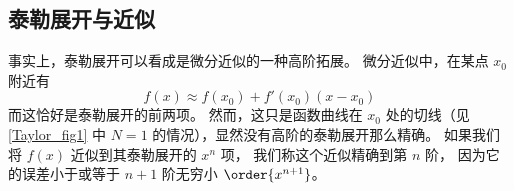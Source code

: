 \subsection{泰勒展开与近似}
事实上，泰勒展开可以看成是微分近似的一种高阶拓展。 微分近似中，在某点 $x_0$ 附近有
\begin{equation}
f(x) \approx f(x_0) + f'(x_0)(x - x_0)
\end{equation}
而这恰好是泰勒展开的前两项。 然而，这只是函数曲线在 $x_0$ 处的切线（见\autoref{Taylor_fig1} 中 $N=1$ 的情况），显然没有高阶的泰勒展开那么精确。 如果我们将 $f(x)$ 近似到其泰勒展开的 $x^n$ 项， 我们称这个近似精确到第 $n$ 阶， 因为它的误差小于或等于 $n + 1$ 阶无穷小 $\order{x^{n + 1}}$。
